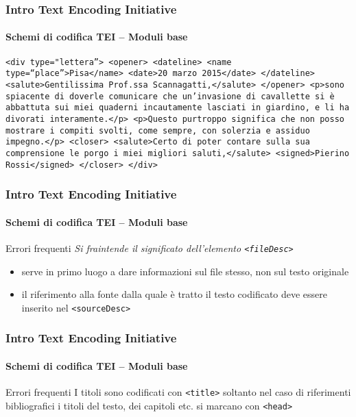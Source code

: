 \begin{frame}
	\frametitle{Intro Text Encoding Initiative}
	\framesubtitle{Schemi di codifica TEI – Moduli base}
	\addtocounter{nframe}{1}        
        \texttt{<div type="lettera”>
        <opener>
        <dateline>
        <name type=``place''>Pisa</name>
        <date>20 marzo 2015</date>
        </dateline>
        <salute>Gentilissima Prof.ssa Scannagatti,</salute>
        </opener>
        <p>sono spiacente di doverle comunicare che un’invasione di cavallette si
        è abbattuta sui miei quaderni incautamente lasciati in giardino, e li ha
        divorati interamente.</p>
        <p>Questo purtroppo significa che non posso mostrare i compiti svolti,
        come sempre, con solerzia e assiduo impegno.</p>
        <closer>
        <salute>Certo di poter contare sulla sua comprensione le porgo i miei
        migliori saluti,</salute>
        <signed>Pierino Rossi</signed>
        </closer>
        </div>}

\end{frame}





\begin{frame}
	\frametitle{Intro Text Encoding Initiative}
	\framesubtitle{Schemi di codifica TEI – Moduli base}
	\addtocounter{nframe}{1}

	\begin{block}{Errori frequenti}
        \textit{Si fraintende il significato dell’elemento \texttt{<fileDesc>}}
        \begin{itemize}
            \item serve in primo luogo a dare informazioni sul file stesso, non sul testo originale
            \item il riferimento alla fonte dalla quale è tratto il testo codificato
            deve essere inserito nel \texttt{<sourceDesc>}
        \end{itemize}
    \end{block}

\end{frame}


\begin{frame}
	\frametitle{Intro Text Encoding Initiative}
	\framesubtitle{Schemi di codifica TEI – Moduli base}
	\addtocounter{nframe}{1}

	\begin{block}{Errori frequenti}
        I titoli sono codificati con \texttt{<title>} soltanto nel caso di riferimenti bibliografici i titoli del testo, dei capitoli etc. si marcano con \texttt{<head>}
    \end{block}
    
   

\end{frame}


